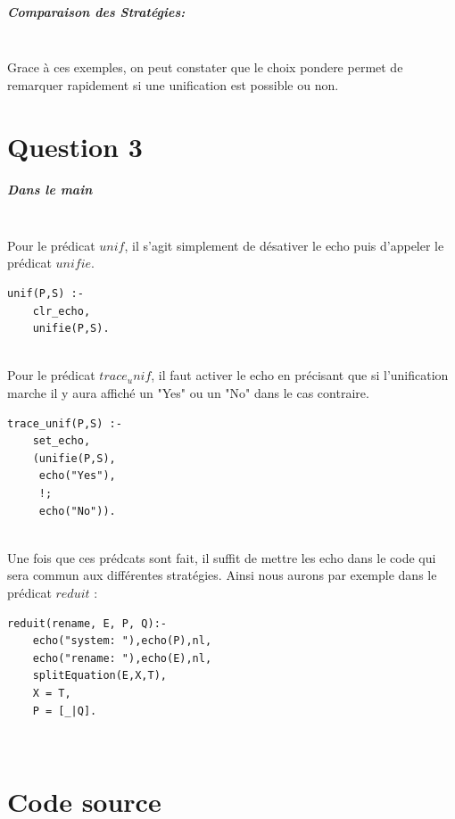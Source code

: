 \documentclass[10pt,a4paper]{report}
\begin{document}
\paragraph{Comparaison des Stratégies:} ~\\

Grace à ces exemples, on peut constater que le choix pondere permet de remarquer rapidement si une unification est possible ou non.

\mbox{}
\newpage
\chapter*{Question 3}
\paragraph{Dans le main} ~\\
Pour le prédicat $unif$, il s'agit simplement de désativer le echo puis d'appeler le prédicat $unifie$.
\begin{lstlisting}[caption ={unif dans $main.pl$}]
unif(P,S) :-
	clr_echo,
	unifie(P,S).
\end{lstlisting} ~\\
Pour le prédicat $trace_unif$, il faut activer le echo en précisant que si l'unification marche il y aura affiché un "Yes" ou un "No" dans le cas contraire.
\begin{lstlisting}[caption ={trace unif dans $main.pl$}]
trace_unif(P,S) :-
	set_echo,
	(unifie(P,S),
	 echo("Yes"),
	 !;
	 echo("No")).
\end{lstlisting} ~\\
Une fois que ces prédcats sont fait, il suffit de mettre les echo dans le code qui sera commun aux différentes stratégies. Ainsi nous aurons par exemple dans le prédicat $reduit$ :
\begin{lstlisting}[caption ={Les echos dans $main.pl$}]
reduit(rename, E, P, Q):-
	echo("system: "),echo(P),nl,
	echo("rename: "),echo(E),nl,
	splitEquation(E,X,T),
	X = T,
	P = [_|Q].
\end{lstlisting} ~\\






\mbox{}
\newpage
\chapter*{Code source}
\end{document}
